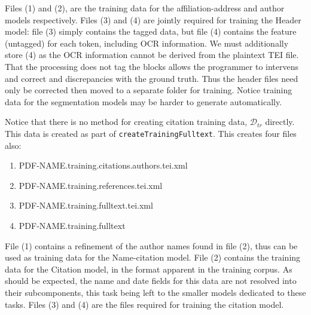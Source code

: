 \documentclass[11pt, oneside]{scrartcl}   	%
\begin{document}
Files (1) and (2), are the training data for the affiliation-address and author models respectively. Files (3) and (4) are jointly required for training the Header model: file (3) simply contains the tagged data, but file (4) contains the feature (untagged) for each token, including OCR information. We must additionally store (4) as the OCR information cannot be derived from the plaintext TEI file. That the processing does not tag the blocks allows the programmer to intervens and correct and discrepancies with the ground truth. Thus the header files need only be corrected then moved to a separate folder for training. Notice training data for the segmentation models may be harder to generate automatically.

Notice that there is no method for creating citation training data, $\mathcal{D}_{tr}$ directly. This data is created as part of \texttt{createTrainingFulltext}. This creates four files also:

\begin{enumerate}
\item PDF-NAME.training.citations.authors.tei.xml
\item PDF-NAME.training.references.tei.xml
\item PDF-NAME.training.fulltext.tei.xml
\item PDF-NAME.training.fulltext
\end{enumerate}

File (1) contains a refinement of the author names found in file (2), thus can be used as training data for the Name-citation model. File (2) contains the training data for the Citation model, in the format apparent in the training corpus. As should be expected, the name and date fields for this data are not resolved into their subcomponents, this task being left to the smaller models dedicated to these tasks. Files (3) and (4) are the files required for training the citation model.
\end{document}
